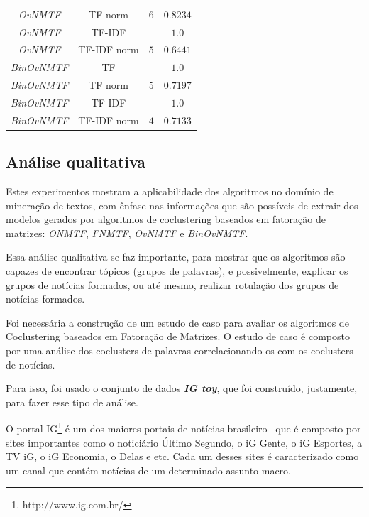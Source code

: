 \documentclass[
    12pt,                %
    oneside,            %
    a4paper,            %
    english,            %
    brazil                %
    ]{abntex2ppgsi}
\begin{document}
\begin{table}[htpb]
\begin{tabular}{c|c|c|c}
             \textit{OvNMTF}        & TF norm       & $6$ & $0.8234$         \\
             \textit{OvNMTF}        & TF-IDF        &     & $1.0$            \\
             \textit{OvNMTF}        & TF-IDF norm   & $5$ & $0.6441$            \\
             \hline
             \textit{BinOvNMTF}     & TF            &     & $1.0$            \\
             \textit{BinOvNMTF}     & TF norm       & $5$ & $0.7197$         \\
             \textit{BinOvNMTF}     & TF-IDF        &     & $1.0$            \\
             \textit{BinOvNMTF}     & TF-IDF norm   & $4$ & $0.7133$         \\
             \hline
         \end{tabular}
 \label{tab:experiments-quant:igtoy}
 \end{table}

\subsection{Análise qualitativa}

Estes experimentos mostram a aplicabilidade dos algoritmos no domínio de mineração de textos, com ênfase nas informações que são possíveis de extrair dos modelos gerados por algoritmos de coclustering baseados em fatoração de matrizes: \textit{ONMTF}, \textit{FNMTF}, \textit{OvNMTF} e \textit{BinOvNMTF}.

Essa análise qualitativa se faz importante, para mostrar que os algoritmos são capazes de encontrar tópicos (grupos de palavras), e possivelmente, explicar os grupos de notícias formados, ou até mesmo, realizar rotulação dos grupos de notícias formados.

Foi necessária a construção de um estudo de caso para avaliar os algoritmos de Coclustering baseados em Fatoração de Matrizes.
O estudo de caso é composto por uma análise dos coclusters de palavras correlacionando-os com os coclusters de notícias.

Para isso, foi usado o conjunto de dados \textit{\textbf{IG toy}}, que foi construído, justamente, para fazer esse tipo de análise.

O portal IG\footnote{http://www.ig.com.br/} é um dos maiores portais de notícias brasileiro~\cite{topsites} que é composto por sites importantes como o noticiário Último Segundo, o iG Gente, o iG Esportes, a TV iG, o iG Economia, o Delas e etc.
Cada um desses sites é caracterizado como um canal que contém notícias de um determinado assunto macro.
\end{document}

